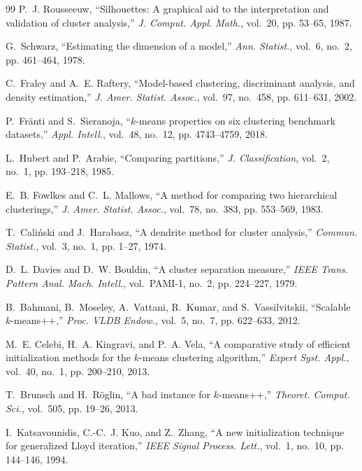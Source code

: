 \documentclass[journal]{IEEEtran}
\begin{document}
\begin{thebibliography}{99}
P.~J. Rousseeuw, ``Silhouettes: A graphical aid to the interpretation and validation of cluster analysis,'' \emph{J. Comput. Appl. Math.}, vol.~20, pp. 53--65, 1987.

G.~Schwarz, ``Estimating the dimension of a model,'' \emph{Ann. Statist.}, vol.~6, no.~2, pp. 461--464, 1978.

C.~Fraley and A.~E. Raftery, ``Model-based clustering, discriminant analysis, and density estimation,'' \emph{J. Amer. Statist. Assoc.}, vol.~97, no.~458, pp. 611--631, 2002.

P.~Fränti and S.~Sieranoja, ``$k$-means properties on six clustering benchmark datasets,'' \emph{Appl. Intell.}, vol.~48, no.~12, pp. 4743--4759, 2018.

L.~Hubert and P.~Arabie, ``Comparing partitions,'' \emph{J. Classification}, vol.~2, no.~1, pp. 193--218, 1985.

E.~B. Fowlkes and C.~L. Mallows, ``A method for comparing two hierarchical clusterings,'' \emph{J. Amer. Statist. Assoc.}, vol.~78, no.~383, pp. 553--569, 1983.

T.~Caliński and J.~Harabasz, ``A dendrite method for cluster analysis,'' \emph{Commun. Statist.}, vol.~3, no.~1, pp. 1--27, 1974.

D.~L. Davies and D.~W. Bouldin, ``A cluster separation measure,'' \emph{IEEE Trans. Pattern Anal. Mach. Intell.}, vol.~PAMI-1, no.~2, pp. 224--227, 1979.

B.~Bahmani, B.~Moseley, A.~Vattani, R.~Kumar, and S.~Vassilvitskii, ``Scalable $k$-means++,'' \emph{Proc. VLDB Endow.}, vol.~5, no.~7, pp. 622--633, 2012.

M.~E. Celebi, H.~A. Kingravi, and P.~A. Vela, ``A comparative study of efficient initialization methods for the $k$-means clustering algorithm,'' \emph{Expert Syst. Appl.}, vol.~40, no.~1, pp. 200--210, 2013.

T.~Brunsch and H.~Röglin, ``A bad instance for $k$-means++,'' \emph{Theoret. Comput. Sci.}, vol.~505, pp. 19--26, 2013.

I.~Katsavounidis, C.-C.~J. Kuo, and Z.~Zhang, ``A new initialization technique for generalized Lloyd iteration,'' \emph{IEEE Signal Process. Lett.}, vol.~1, no.~10, pp. 144--146, 1994.


\end{thebibliography}
\end{document}

